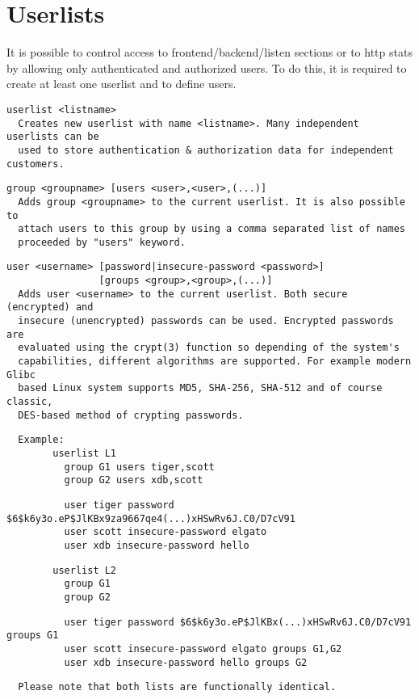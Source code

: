 
\section{Userlists}

It is possible to control access to frontend/backend/listen sections or to
http stats by allowing only authenticated and authorized users. To do this,
it is required to create at least one userlist and to define users.

\begin{verbatim}
userlist <listname>
  Creates new userlist with name <listname>. Many independent userlists can be
  used to store authentication & authorization data for independent customers.
\end{verbatim}

\begin{verbatim}
group <groupname> [users <user>,<user>,(...)]
  Adds group <groupname> to the current userlist. It is also possible to
  attach users to this group by using a comma separated list of names
  proceeded by "users" keyword.
\end{verbatim}

\begin{verbatim}
user <username> [password|insecure-password <password>]
                [groups <group>,<group>,(...)]
  Adds user <username> to the current userlist. Both secure (encrypted) and
  insecure (unencrypted) passwords can be used. Encrypted passwords are
  evaluated using the crypt(3) function so depending of the system's
  capabilities, different algorithms are supported. For example modern Glibc
  based Linux system supports MD5, SHA-256, SHA-512 and of course classic,
  DES-based method of crypting passwords.
\end{verbatim}

\begin{verbatim}
  Example:
        userlist L1
          group G1 users tiger,scott
          group G2 users xdb,scott
\end{verbatim}

\begin{verbatim}
          user tiger password $6$k6y3o.eP$JlKBx9za9667qe4(...)xHSwRv6J.C0/D7cV91
          user scott insecure-password elgato
          user xdb insecure-password hello
\end{verbatim}

\begin{verbatim}
        userlist L2
          group G1
          group G2
\end{verbatim}

\begin{verbatim}
          user tiger password $6$k6y3o.eP$JlKBx(...)xHSwRv6J.C0/D7cV91 groups G1
          user scott insecure-password elgato groups G1,G2
          user xdb insecure-password hello groups G2
\end{verbatim}

\begin{verbatim}
  Please note that both lists are functionally identical.
\end{verbatim}


